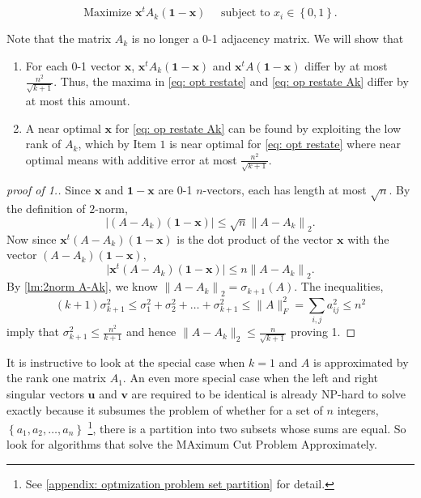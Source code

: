 \begin{equation} \label{eq: op restate Ak}
   \text{Maximize } \mathbf{x} ^t A_k (\mathbf{1} - \mathbf{x}  ) \quad \text{ subject to } x_i \in \left\{ 0,1 \right\} . 
\end{equation}

Note that the matrix \(A_k\) is no longer a 0-1 adjacency matrix. 
We will show that 
\begin{enumerate}
  \item For each 0-1 vector \(\mathbf{x} \), \(\mathbf{x} ^t A_k (\mathbf{1} - \mathbf{x}  )\) and \(\mathbf{x} ^t A (\mathbf{1} - \mathbf{x}  )\)  differ by at most  \(\frac{n^2}{\sqrt{k+1} }\). Thus, the maxima in \autoref{eq: opt restate} and \autoref{eq: op restate Ak} differ by at most this amount. 
  \item A near optimal \(\mathbf{x} \) for \autoref{eq: op restate Ak} can be found by exploiting the low rank of \(A_k\), which by Item \(1\) is near optimal for \autoref{eq: opt restate} where near optimal means with additive error at most \(\frac{n^2}{\sqrt{k+1} }\).       
\end{enumerate}  

\begin{proof}[proof of 1.]
  Since \(\mathbf{x} \) and \(\mathbf{1} - \mathbf{x}  \) are 0-1 \(n\)-vectors, each has length at most \(\sqrt{n} \). By the definition of \(2\)-norm,
  \[
    \vert \left( A - A_k \right)(\mathbf{1} - \mathbf{x}  ) \vert \le \sqrt{n} \left\lVert A - A_k \right\rVert _2.   
  \]  
  Now since \(\mathbf{x} ^t (A-A_k) (\mathbf{1} - \mathbf{x}  )\) is the dot product of the vector \(\mathbf{x} \) with the vector \((A-A_k) (\mathbf{1} - \mathbf{x}  )\), 
  \[
       \vert \mathbf{x} ^t\left( A - A_k \right)(\mathbf{1} - \mathbf{x}  ) \vert \le n \left\lVert A - A_k \right\rVert _2.  
  \]  
  By \autoref{lm:2norm A-Ak}, we know \(\left\lVert A - A_k \right\rVert _2 = \sigma _{k+1}(A) \). The inequalities,
  \[
    (k+1) \sigma _{k+1}^2 \le \sigma _1^2 + \sigma _2^2 +\dots +\sigma _{k+1}^2 \le \lVert A \rVert_F^2 = \sum_{i, j} a_{ij}^2 \le n^2 
  \] 
  imply that \(\sigma _{k+1}^2 \le \frac{n^2}{k+1}\) and hence \(\lVert A - A_k \rVert_2 \le \frac{n}{\sqrt{k+1} } \) proving 1.  
\end{proof}

  It is instructive to look at the special case when \(k=1\) and \(A\) is approximated by the rank one matrix \(A_1\). An even more special case when the left and right singular vectors \(\mathbf{u} \) and \(\mathbf{v} \) are required to be identical is already NP-hard to solve exactly because it subsumes the problem of whether for a set of \(n\) integers, \(\left\{ a_1,a_2, \dots ,a_n \right\} \) \footnote{See \autoref{appendix: optmization problem set partition} for detail.}, there is a partition into two subsets whose sums are equal. So look for algorithms that solve the MAximum Cut Problem Approximately. 

